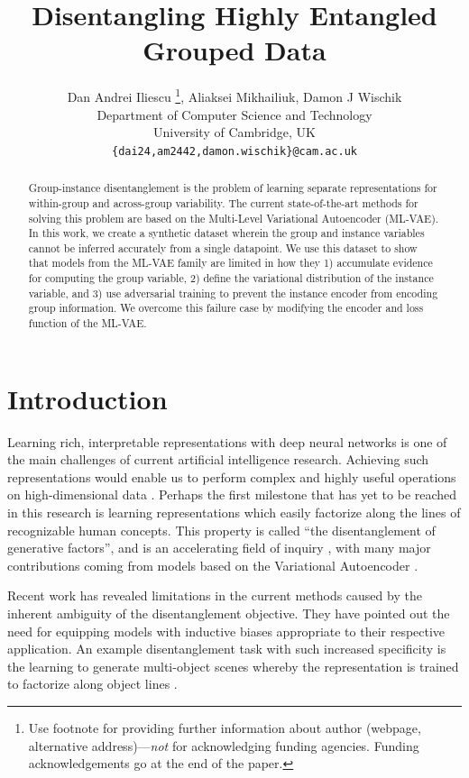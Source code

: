 \documentclass{article} %
\title{Disentangling Highly Entangled Grouped Data}
\author{Dan Andrei Iliescu \thanks{ Use footnote for providing further information
about author (webpage, alternative address)---\emph{not} for acknowledging
funding agencies.  Funding acknowledgements go at the end of the paper.},  Aliaksei Mikhailiuk,  Damon J Wischik\\
Department of Computer Science and Technology\\
University of Cambridge,  UK\\
\texttt{\{dai24,am2442,damon.wischik\}@cam.ac.uk}}
\begin{document}
\maketitle

\begin{abstract}
Group-instance disentanglement is the problem of learning separate representations for within-group and across-group variability. The current state-of-the-art methods for solving this problem are based on the Multi-Level Variational Autoencoder (ML-VAE). In this work, we create a synthetic dataset wherein the group and instance variables cannot be inferred accurately from a single datapoint. We use this dataset to show that models from the ML-VAE family are limited in how they 1) accumulate evidence for computing the group variable, 2) define the variational distribution of the instance variable, and 3) use adversarial training to prevent the instance encoder from encoding group information. We overcome this failure case by modifying the encoder and loss function of the ML-VAE.
\end{abstract}

\section{Introduction}

Learning rich, interpretable representations with deep neural networks is one of the main challenges of current artificial intelligence research. Achieving such representations would enable us to perform complex and highly useful operations on high-dimensional data \citep{bengio2013representation}. Perhaps the first milestone that has yet to be reached in this research is learning representations which easily factorize along the lines of recognizable human concepts. This property is called ``the disentanglement of generative factors'', and is an accelerating field of inquiry \citep{tschannen2018recent}, with many major contributions coming from models based on the Variational Autoencoder \citep{kingma2013auto, rezende2014stochastic}.

Recent work \citep{locatello2018challenging,van2019disentangled} has revealed limitations in the current methods caused by the inherent ambiguity of the disentanglement objective. They have pointed out the need for equipping models with inductive biases appropriate to their respective application. An example disentanglement task with such increased specificity is the learning to generate multi-object scenes whereby the representation is trained to factorize along object lines \citep{engelcke2019genesis,burgess2019monet,greff2019multi}.
\end{document}
